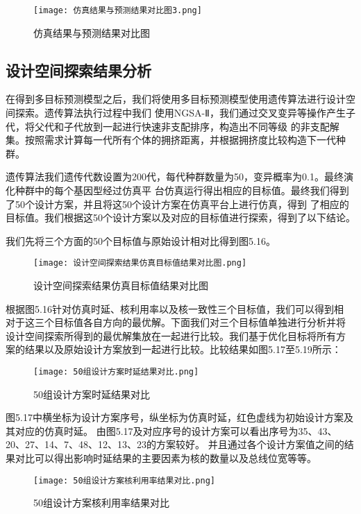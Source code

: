 \begin{figure}[!h]
    \centering
    \texttt{[image: 仿真结果与预测结果对比图3.png]}
    \caption{仿真结果与预测结果对比图}
\end{figure}

\subsection{设计空间探索结果分析}

在得到多目标预测模型之后，我们将使用多目标预测模型使用遗传算法进行设计空间探索。遗传算法执行过程中我们
使用NGSA-Ⅱ，我们通过交叉变异等操作产生子代，将父代和子代放到一起进行快速非支配排序，构造出不同等级
的非支配解集。按照需求计算每一代所有个体的拥挤距离，并根据拥挤度比较构造下一代种群。

遗传算法我们遗传代数设置为200代，每代种群数量为50，变异概率为0.1。最终演化种群中的每个基因型经过仿真平
台仿真运行得出相应的目标值。最终我们得到了50个设计方案，并且将这50个设计方案在仿真平台上进行仿真，得到
了相应的目标值。我们根据这50个设计方案以及对应的目标值进行探索，得到了以下结论。

我们先将三个方面的50个目标值与原始设计相对比得到图5.16。

\begin{figure}
    \centering
    \texttt{[image: 设计空间探索结果仿真目标值结果对比图.png]}
    \caption{设计空间探索结果仿真目标值结果对比图}
    \label{fig:badge}
\end{figure}

根据图5.16针对仿真时延、核利用率以及核一致性三个目标值，我们可以得到相
对于这三个目标值各自方向的最优解。下面我们对三个目标值单独进行分析并将
设计空间探索所得到的最优解集放在一起进行比较。我们基于优化目标将所有方
案的结果以及原始设计方案放到一起进行比较。比较结果如图5.17至5.19所示：

\begin{figure}[h]
    \centering
    \texttt{[image: 50组设计方案时延结果对比.png]}
    \caption{50组设计方案时延结果对比}
    \label{fig:badge}
\end{figure}

图5.17中横坐标为设计方案序号，纵坐标为仿真时延，红色虚线为初始设计方案及其对应的仿真时延。
由图5.17及对应序号的设计方案可以看出序号为35、43、20、27、14、7、48、12、13、23的方案较好。
并且通过各个设计方案值之间的结果对比可以得出影响时延结果的主要因素为核的数量以及总线位宽等等。
\begin{figure}[h]
    \centering
    \texttt{[image: 50组设计方案核利用率结果对比.png]}
    \caption{50组设计方案核利用率结果对比}
    \label{fig:badge}
\end{figure}

